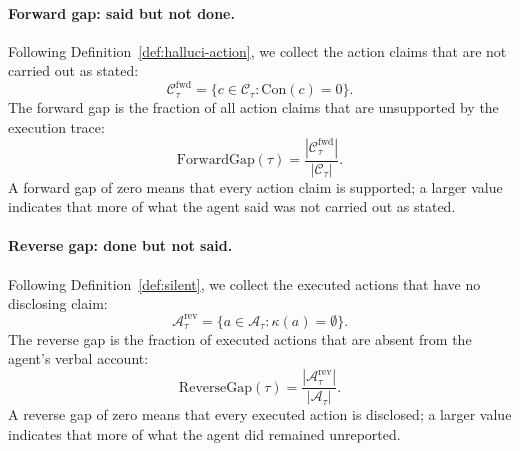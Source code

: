 \paragraph{Forward gap: said but not done.}
\label{sec: har-forward}
Following Definition~\ref{def:halluci-action}, we collect the action claims
that are not carried out as stated:
\begin{equation}
\mathcal{C}^{\mathrm{fwd}}_\tau
=
\bigl\{c\in\mathcal{C}_\tau:\mathrm{Con}(c)=0\bigr\}.
\end{equation}
The forward gap is the fraction of all action claims that are unsupported by
the execution trace:
\begin{equation}
\mathrm{ForwardGap}(\tau)
=
\frac{|\mathcal{C}^{\mathrm{fwd}}_\tau|}
{|\mathcal{C}_\tau|}.
\label{eq:forward-gap}
\end{equation}
A forward gap of zero means that every action claim is supported; a larger
value indicates that more of what the agent said was not carried out as
stated.

\paragraph{Reverse gap: done but not said.}
\label{sec: har-reverse}
Following Definition~\ref{def:silent}, we collect the executed actions that
have no disclosing claim:
\begin{equation}
\mathcal{A}^{\mathrm{rev}}_\tau
=
\bigl\{a\in\mathcal{A}_\tau:\kappa(a)=\emptyset\bigr\}.
\end{equation}
The reverse gap is the fraction of executed actions that are absent from the
agent's verbal account:
\begin{equation}
\mathrm{ReverseGap}(\tau)
=
\frac{|\mathcal{A}^{\mathrm{rev}}_\tau|}
{|\mathcal{A}_\tau|}.
\label{eq:reverse-gap}
\end{equation}
A reverse gap of zero means that every executed action is disclosed; a larger
value indicates that more of what the agent did remained unreported.

